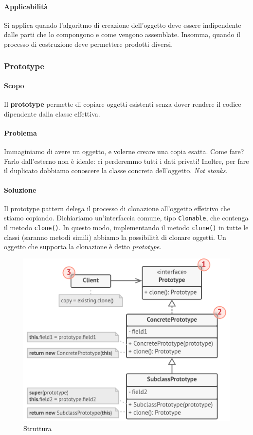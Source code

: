 \documentclass[11pt]{article}
\newcommand{\code}[1]{\texttt{#1}}
\begin{document}
\paragraph{Applicabilità}
Si applica quando l'algoritmo di creazione dell'oggetto deve essere indipendente dalle parti che lo compongono e come vengono assemblate. Insomma, quando il processo di costruzione deve permettere prodotti diversi.
\subsubsection{Prototype}
\paragraph{Scopo}
Il \textbf{prototype} permette di copiare oggetti esistenti senza dover rendere il codice dipendente dalla classe effettiva.
\paragraph{Problema}
Immaginiamo di avere un oggetto, e volerne creare una copia esatta. Come fare? Farlo dall'esterno non è ideale: ci perderemmo tutti i dati privati! Inoltre, per fare il duplicato dobbiamo conoscere la classe concreta dell'oggetto. \textit{Not stonks.}
\paragraph{Soluzione}
Il prototype pattern delega il processo di clonazione all'oggetto effettivo che stiamo copiando. Dichiariamo un'interfaccia comune, tipo \code{Clonable}, che contenga il metodo \code{clone()}. In questo modo, implementando il metodo \code{clone()} in tutte le classi (saranno metodi simili) abbiamo la possibilità di clonare oggetti. Un oggetto che supporta la clonazione è detto \textit{prototype.}
\begin{figure}[H]
    \centering
    \includegraphics[width=\linewidth]{res/teoria/Prototype.png}
    \caption{Struttura}
\end{figure}
\end{document}
